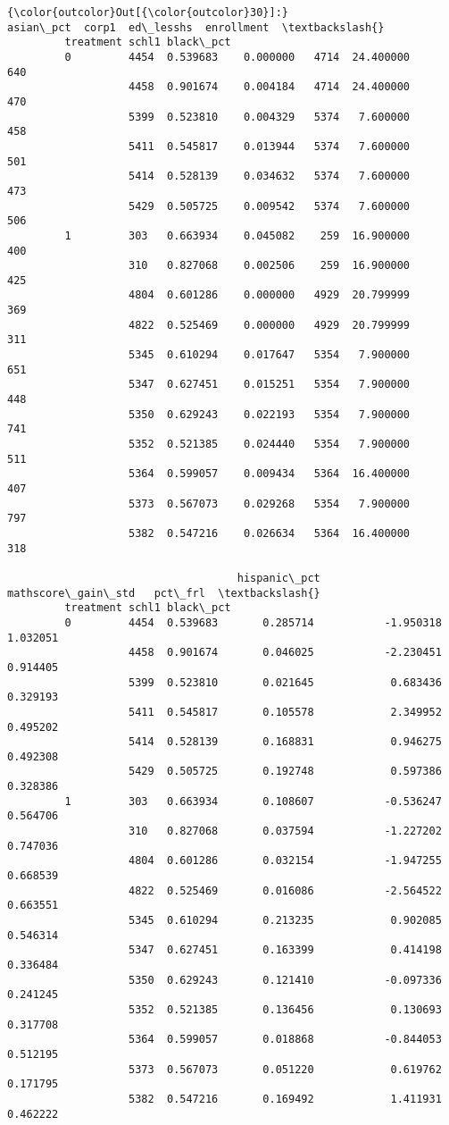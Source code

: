 \documentclass[11pt]{article}
\begin{document}
\begin{Verbatim}[commandchars=\\\{\}]
{\color{outcolor}Out[{\color{outcolor}30}]:}                            asian\_pct  corp1  ed\_lesshs  enrollment  \textbackslash{}
         treatment schl1 black\_pct                                            
         0         4454  0.539683    0.000000   4714  24.400000         640   
                   4458  0.901674    0.004184   4714  24.400000         470   
                   5399  0.523810    0.004329   5374   7.600000         458   
                   5411  0.545817    0.013944   5374   7.600000         501   
                   5414  0.528139    0.034632   5374   7.600000         473   
                   5429  0.505725    0.009542   5374   7.600000         506   
         1         303   0.663934    0.045082    259  16.900000         400   
                   310   0.827068    0.002506    259  16.900000         425   
                   4804  0.601286    0.000000   4929  20.799999         369   
                   4822  0.525469    0.000000   4929  20.799999         311   
                   5345  0.610294    0.017647   5354   7.900000         651   
                   5347  0.627451    0.015251   5354   7.900000         448   
                   5350  0.629243    0.022193   5354   7.900000         741   
                   5352  0.521385    0.024440   5354   7.900000         511   
                   5364  0.599057    0.009434   5364  16.400000         407   
                   5373  0.567073    0.029268   5354   7.900000         797   
                   5382  0.547216    0.026634   5364  16.400000         318   
         
                                    hispanic\_pct  mathscore\_gain\_std   pct\_frl  \textbackslash{}
         treatment schl1 black\_pct                                               
         0         4454  0.539683       0.285714           -1.950318  1.032051   
                   4458  0.901674       0.046025           -2.230451  0.914405   
                   5399  0.523810       0.021645            0.683436  0.329193   
                   5411  0.545817       0.105578            2.349952  0.495202   
                   5414  0.528139       0.168831            0.946275  0.492308   
                   5429  0.505725       0.192748            0.597386  0.328386   
         1         303   0.663934       0.108607           -0.536247  0.564706   
                   310   0.827068       0.037594           -1.227202  0.747036   
                   4804  0.601286       0.032154           -1.947255  0.668539   
                   4822  0.525469       0.016086           -2.564522  0.663551   
                   5345  0.610294       0.213235            0.902085  0.546314   
                   5347  0.627451       0.163399            0.414198  0.336484   
                   5350  0.629243       0.121410           -0.097336  0.241245   
                   5352  0.521385       0.136456            0.130693  0.317708   
                   5364  0.599057       0.018868           -0.844053  0.512195   
                   5373  0.567073       0.051220            0.619762  0.171795   
                   5382  0.547216       0.169492            1.411931  0.462222   
         

\end{Verbatim}
\end{document}
